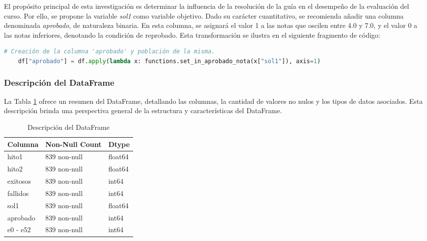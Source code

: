 El propósito principal de esta investigación es determinar la influencia de la resolución de la guía en el desempeño de la evaluación del curso. Por ello, se propone la variable \textit{sol1} como variable objetivo. Dado su carácter cuantitativo, se recomienda añadir una columna denominada \textit{aprobado}, de naturaleza binaria. En esta columna, se asignará el valor 1 a las notas que oscilen entre 4.0 y 7.0, y el valor 0 a las notas inferiores, denotando la condición de reprobado. Esta transformación se ilustra en el siguiente fragmento de código:

\begin{lstlisting}[language=Python, caption=Tratamiento de la Variable Objetivo ,label=lst:trat_varObjetivo]
    # Creación de la columna 'aprobado' y población de la misma.
    df["aprobado"] = df.apply(lambda x: functions.set_in_aprobado_nota(x["sol1"]), axis=1)
\end{lstlisting}

\subsubsection{Descripción del DataFrame}

La Tabla \ref{tab:descripcion_dataframe} ofrece un resumen del DataFrame, detallando las columnas, la cantidad de valores no nulos y los tipos de datos asociados. Esta descripción brinda una perspectiva general de la estructura y características del DataFrame.

\begin{table}[H]
    \centering
    \caption{Descripción del DataFrame}
    \begin{tabular}{lll}
        \hline
        \textbf{Columna} & \textbf{Non-Null Count} & \textbf{Dtype} \\
        \hline
        hito1            & 839 non-null            & float64        \\
        hito2            & 839 non-null            & float64        \\
        exitosos         & 839 non-null            & int64          \\
        fallidos         & 839 non-null            & int64          \\
        sol1             & 839 non-null            & float64        \\
        aprobado         & 839 non-null            & int64          \\
        e0 - e52         & 839 non-null            & int64          \\
        \hline
    \end{tabular}%
    \label{tab:descripcion_dataframe}%
\end{table}%

